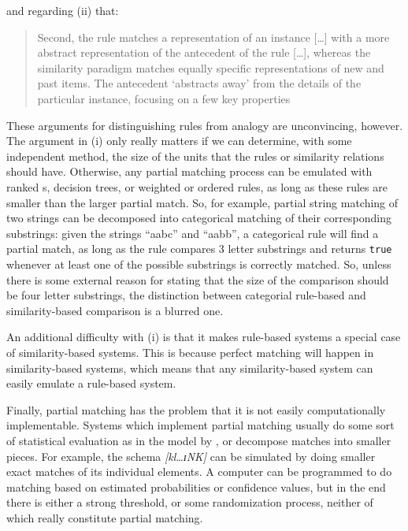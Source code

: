 and regarding (ii) that:

\begin{quotation}
  Second,  the  rule  matches  a  representation  of  an  instance [\dots] with a more abstract representation of the antecedent of the rule [\dots], whereas the similarity paradigm matches equally specific representations of new and past items. The antecedent ‘abstracts away’ from the details of the particular instance, focusing on a few key properties \autocite[202]{Hahn.1998}
\end{quotation}

These arguments for distinguishing rules from analogy are unconvincing, however. The argument in (i) only really matters if we can determine, with some independent method, the size of the units that the rules or similarity relations should have. Otherwise, any partial matching process can be emulated with ranked s, decision trees, or weighted or ordered rules, as long as these rules are smaller than the larger partial match. So, for example, partial string matching of two strings can be decomposed into categorical matching of their corresponding substrings: given the strings ``aabc'' and ``aabb'', a categorical rule will find a partial match, as long as the rule compares 3 letter substrings and returns \texttt{true} whenever at least one of the possible substrings is correctly matched. So, unless there is some external reason for stating that the size of the comparison should be four letter substrings, the distinction between categorial rule-based and similarity-based comparison is a blurred one.

An additional difficulty with (i) is that it makes rule-based systems a special case of similar\-ity-based systems. This is because perfect matching will happen in similarity-based systems, which means that any similarity-based system can easily emulate a rule-based system.

Finally, partial matching has the problem that it is not easily computationally implementable. Systems which implement partial matching usually do some sort of statistical evaluation as in the model by \textcite{Albright.2003}, or decompose matches into smaller pieces. For example, the schema \textit{[kl\dots ɪNK]} can be simulated by doing smaller exact matches of its individual elements. A computer can be programmed to do matching based on estimated probabilities or confidence values, but in the end there is either a strong threshold, or some randomization process, neither of which really constitute partial matching.

